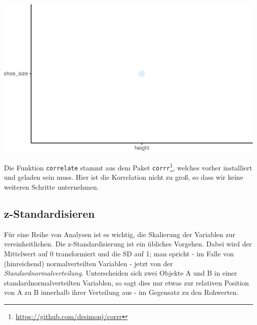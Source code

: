 \documentclass[12pt,ngerman,]{book}
\newenvironment{Shaded}{\begin{snugshade}}{\end{snugshade}}
\newcommand{\KeywordTok}[1]{\textcolor[rgb]{0.13,0.29,0.53}{\textbf{{#1}}}}
\newcommand{\StringTok}[1]{\textcolor[rgb]{0.31,0.60,0.02}{{#1}}}
\newcommand{\CommentTok}[1]{\textcolor[rgb]{0.56,0.35,0.01}{\textit{{#1}}}}
\newcommand{\NormalTok}[1]{{#1}}
\let\rmarkdownfootnote\footnote%
\def\footnote{\protect\rmarkdownfootnote}
\renewenvironment{Shaded}{\begin{kframe}}{\end{kframe}}
\begin{document}
\begin{center}\includegraphics[width=0.7\linewidth]{043_Typische_Probleme_Datenanalyse_files/figure-latex/unnamed-chunk-10-1} \end{center}

Die Funktion \texttt{correlate} stammt aus dem Paket
\texttt{corrr}\footnote{\url{https://github.com/drsimonj/corrr}},
welches vorher installiert und geladen sein muss. Hier ist die
Korrelation nicht zu groß, so dass wir keine weiteren Schritte
unternehmen.

\subsection{z-Standardisieren}\label{z-standardisieren}

Für eine Reihe von Analysen ist es wichtig, die Skalierung der Variablen
zur vereinheitlichen. Die z-Standardisierung ist ein übliches Vorgehen.
Dabei wird der Mittelwert auf 0 transformiert und die SD auf 1; man
spricht - im Falle von (hinreichend) normalverteilten Variablen - jetzt
von der \emph{Standardnormalverteilung}.
Unterscheiden sich zwei Objekte A und B in einer
standardnormalverteilten Variablen, so sagt dies nur etwas zur relativen
Position von A zu B innerhalb ihrer Verteilung aus - im Gegensatz zu den
Rohwerten.

\begin{Shaded}
\end{Shaded}
\end{document}
